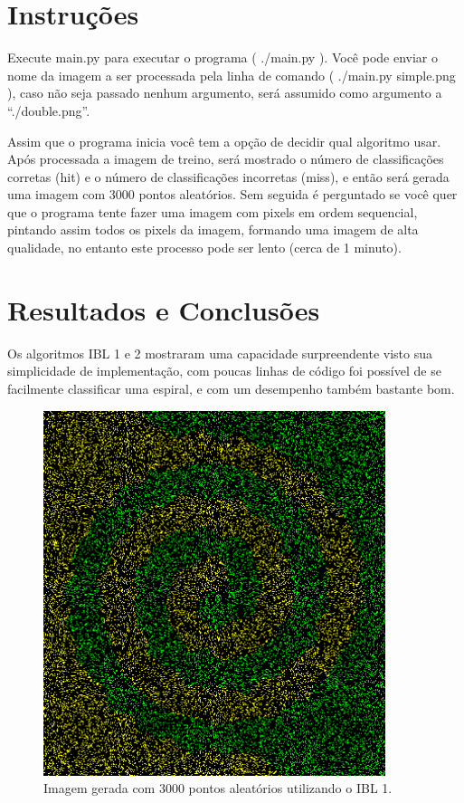 \documentclass[12pt]{article}
\author{Bruno Farias de Loreto}
\begin{document}
\section{Instruções}

Execute main.py para executar o programa ( ./main.py ).
Você pode enviar o nome da imagem a ser processada pela linha de comando ( ./main.py simple.png ), caso
não seja passado nenhum argumento, será assumido como argumento a ``./double.png''.

Assim que o programa inicia você tem a opção de decidir qual algoritmo usar. Após processada a imagem de treino, será mostrado o número de classificações corretas (hit) e o número de classificações incorretas (miss), e então será gerada uma imagem com 3000 pontos aleatórios. Sem seguida é perguntado se você quer que o programa tente fazer uma imagem com pixels em ordem sequencial, pintando assim todos os pixels da imagem, formando uma imagem de alta qualidade, no entanto este processo pode ser lento (cerca de 1 minuto).


\section{Resultados e Conclusões}

Os algoritmos IBL 1 e 2 mostraram uma capacidade surpreendente visto sua simplicidade de implementação, com poucas linhas de código foi possível de se facilmente classificar uma espiral, e com um desempenho também bastante bom.

\begin{figure}[hb]
	\center
	\includegraphics[width=10cm]{./outputs/double3000dots.png}
	\caption{Imagem gerada com 3000 pontos aleatórios utilizando o IBL 1.}
\end{figure}
\end{document}
